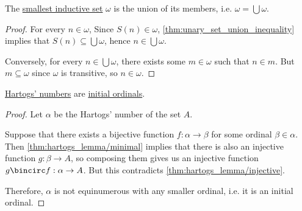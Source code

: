 \begin{lemma}\label{thm:omega_is_supremum_of_finite_ordinals}
  The \hyperref[def:smallest_inductive_set]{smallest inductive set} \( \omega \) is the union of its members, i.e. \( \omega = \bigcup \omega \).
\end{lemma}
\begin{proof}
  For every \( n \in \omega \), Since \( S(n) \in \omega \), \cref{thm:unary_set_union_inequality} implies that \( S(n) \subseteq \bigcup \omega \), hence \( n \in \bigcup \omega \).

  Conversely, for every \( n \in \bigcup \omega \), there exists some \( m \in \omega \) such that \( n \in m \). But \( m \subseteq \omega \) since \( \omega \) is transitive, so \( n \in \omega \).
\end{proof}

\begin{lemma}\label{thm:hartogs_number_is_initial_ordinal}
  \hyperref[def:hartogs_number]{Hartogs' numbers} are \hyperref[def:initial_ordinal]{initial ordinals}.
\end{lemma}
\begin{proof}
  Let \( \alpha \) be the Hartogs' number of the set \( A \).

  Suppose that there exists a bijective function \( f: \alpha \to \beta \) for some ordinal \( \beta \in \alpha \). Then \cref{thm:hartogs_lemma/minimal} implies that there is also an injective function \( g: \beta \to A \), so composing them gives us an injective function \( g \bincirc f: \alpha \to A \). But this contradicts \cref{thm:hartogs_lemma/injective}.

  Therefore, \( \alpha \) is not equinumerous with any smaller ordinal, i.e. it is an initial ordinal.
\end{proof}

